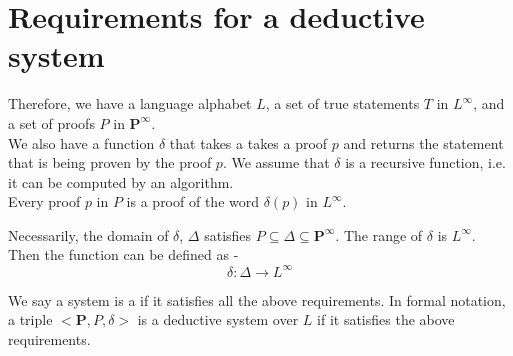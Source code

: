 \documentclass[openany]{book}
\begin{document}
\section{Requirements for a deductive system}
Therefore, we have a language alphabet $L$, a set of true statements $T$ in $L^{\infty}$, and a set of proofs $P$ in $\textbf{P}^{\infty}$. \\
We also have a function $\delta$ that takes a takes a proof $p$ and returns the statement that is being proven by the proof $p$. We assume that $\delta$ is a recursive function, i.e. it can be computed by an algorithm.\\
Every proof $p$ in $P$ is a proof of the word $\delta(p)$ in $L^{\infty}$.
\begin{mynote}
    Necessarily, the domain of $\delta$, $\Delta$ satisfies $P \subseteq \Delta \subseteq \textbf{P}^{\infty}$. The range of $\delta$ is $L^{\infty}$. \\
    Then the function can be defined as - 
      $$\delta: \Delta \rightarrow L^{\infty}$$ 
\end{mynote}
We say a system is a  if it satisfies all the above requirements. In formal notation, a triple $<\textbf{P}, P, \delta>$ is a deductive system over $L$ if it satisfies the above requirements. 
\end{document}
